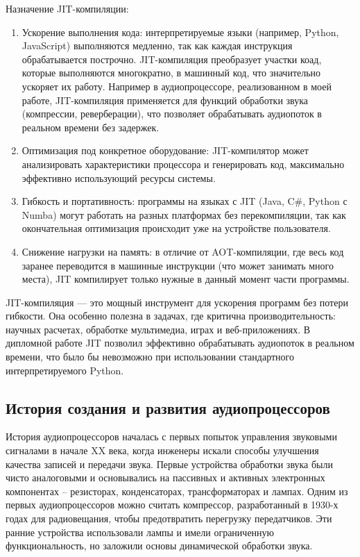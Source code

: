 Назначение JIT-компиляции:
\begin{enumerate}
	\item Ускорение выполнения кода: интерпретируемые языки (например, Python, JavaScript) выполняются медленно, так как каждая инструкция обрабатывается построчно. JIT-компиляция преобразует участки коад, которые выполняются многократно, в машинный код, что значительно ускоряет их работу. Например в аудиопроцессоре, реализованном в моей работе, JIT-компиляция применяется для функций обработки звука (компрессии, реверберации), что позволяет обрабатывать аудиопоток в реальном времени без задержек.
	\item Оптимизация под конкретное оборудование: JIT-компилятор может анализировать характеристики процессора и генерировать код, максимально эффективно использующий ресурсы системы.
	\item Гибкость и портативность: программы на языках с JIT (Java, C\#, Python с Numba) могут работать на разных платформах без перекомпиляции, так как окончательная оптимизация происходит уже на устройстве пользователя.
	\item Снижение нагрузки на память: в отличие от AOT-компиляции, где весь код заранее переводится в машинные инструкции (что может занимать много места), JIT компилирует только нужные в данный момент части программы.
\end{enumerate}

JIT-компиляция — это мощный инструмент для ускорения программ без потери гибкости. Она особенно полезна в задачах, где критична производительность: научных расчетах, обработке мультимедиа, играх и веб-приложениях. В дипломной работе JIT позволил эффективно обрабатывать аудиопоток в реальном времени, что было бы невозможно при использовании стандартного интерпретируемого Python.

\subsection{История создания и развития аудиопроцессоров}
История аудиопроцессоров началась с первых попыток управления звуковыми сигналами в начале XX века, когда инженеры искали способы улучшения качества записей и передачи звука. Первые устройства обработки звука были чисто аналоговыми и основывались на пассивных и активных электронных компонентах – резисторах, конденсаторах, трансформаторах и лампах. Одним из первых аудиопроцессоров можно считать компрессор, разработанный в 1930-х годах для радиовещания, чтобы предотвратить перегрузку передатчиков. Эти ранние устройства использовали лампы и имели ограниченную функциональность, но заложили основы динамической обработки звука.

